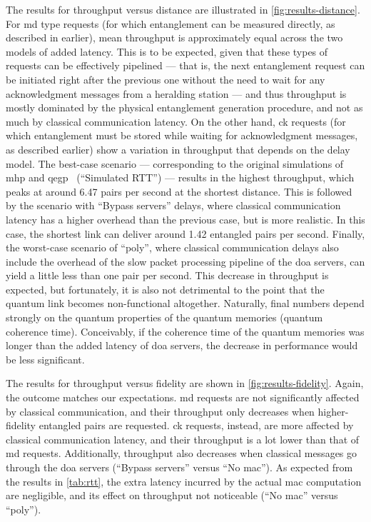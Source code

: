The results for throughput versus distance are illustrated in \cref{fig:results-distance}. For
\acrfull{md} type requests (for which entanglement can be measured directly, as described in
earlier), mean throughput is approximately equal across the two models of added latency. This is to
be expected, given that these types of requests can be effectively pipelined --- that is, the next
entanglement request can be initiated right after the previous one without the need to wait for any
acknowledgment messages from a heralding station --- and thus throughput is mostly dominated by the
physical entanglement generation procedure, and not as much by classical communication latency. On
the other hand, \acrfull{ck} requests (for which entanglement must be stored while waiting for
acknowledgment messages, as described earlier) show a variation in throughput that depends on the
delay model. The best-case scenario --- corresponding to the original simulations of \acrshort{mhp}
and \acrshort{qegp}~\cite{dahlberg_2019_egp} (``Simulated RTT'') --- results in the highest
throughput, which peaks at around \num{6.47} pairs per second at the shortest distance. This is
followed by the scenario with ``Bypass servers'' delays, where classical communication latency has a
higher overhead than the previous case, but is more realistic. In this case, the shortest link can
deliver around \num{1.42} entangled pairs per second. Finally, the worst-case scenario of
``\acrshort{poly}'', where classical communication delays also include the overhead of the slow
packet processing pipeline of the \acrshort{doa} servers, can yield a little less than one pair per
second. This decrease in throughput is expected, but fortunately, it is also not detrimental to the
point that the quantum link becomes non-functional altogether. Naturally, final numbers depend
strongly on the quantum properties of the quantum memories (quantum coherence time). Conceivably, if
the coherence time of the quantum memories was longer than the added latency of \acrshort{doa}
servers, the decrease in performance would be less significant.

The results for throughput versus fidelity are shown in \cref{fig:results-fidelity}. Again, the
outcome matches our expectations. \acrshort{md} requests are not significantly affected by classical
communication, and their throughput only decreases when higher-fidelity entangled pairs are
requested. \acrshort{ck} requests, instead, are more affected by classical communication latency,
and their throughput is a lot lower than that of \acrshort{md} requests. Additionally, throughput
also decreases when classical messages go through the \acrshort{doa} servers (``Bypass servers''
versus ``No \acrshort{mac}''). As expected from the results in \cref{tab:rtt}, the extra latency
incurred by the actual \acrshort{mac} computation are negligible, and its effect on throughput not
noticeable (``No \acrshort{mac}'' versus ``\acrshort{poly}'').

